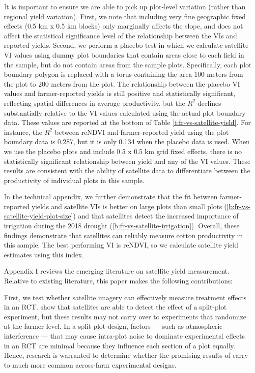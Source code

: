 \documentclass{article}
\begin{document}
It is important to ensure we are able to pick up plot-level variation (rather than regional yield variation). First, we note that including very fine geographic fixed effects (0.5 km x 0.5 km blocks) only marginally affects the slope, and does not affect the statistical significance level of the relationship between the VIs and reported yields. Second, we perform a placebo test in which we calculate satellite VI values using dummy plot boundaries that contain areas close to each field in the sample, but do not contain areas from the sample plots. Specifically, each plot boundary polygon is replaced with a torus containing the area 100 meters from the plot to 200 meters from the plot. The relationship between the placebo VI values and farmer-reported yields is still positive and statistically significant, reflecting spatial differences in average productivity, but the $R^2$ declines substantially relative to the VI values calculated using the actual plot boundary data. These values are reported at the bottom of Table \ref{t:fr-vs-satellite-yield}. For instance, the $R^2$ between reNDVI and farmer-reported yield using the plot boundary data is 0.287, but it is only 0.134 when the placebo data is used. When we use the placebo plots and include 0.5 x 0.5 km grid fixed effects, there is no statistically significant relationship between yield and any of the VI values. These results are consistent with the ability of satellite data to differentiate between the productivity of individual plots in this sample.

In the technical appendix, we further demonstrate that the fit between farmer-reported yields and satellite VIs is better on large plots than small plots (\ref{b:fr-vs-satellite-yield-plot-size}) and that satellites detect the increased importance of irrigation during the 2018 drought (\ref{b:fr-vs-satellite-irrigation}). Overall, these findings demonstrate that satellites can reliably measure cotton productivity in this sample. The best performing VI is reNDVI, so we calculate satellite yield estimates using this index. 

Appendix I reviews the emerging literature on satellite yield measurement. Relative to existing literature, this paper makes the following contributions: 

First, we test whether satellite imagery can effectively measure treatment effects in an RCT. \citet{Jain2019TheData} show that satellites are able to detect the effect of a split-plot experiment, but these results may not carry over to experiments that randomize at the farmer level. In a split-plot design, factors — such as atmospheric interference — that may cause intra-plot noise to dominate experimental effects in an RCT are minimal because they influence each section of a plot equally. Hence, research is warranted to determine whether the promising results of \citet{Jain2019TheData} carry to much more common across-farm experimental designs. 
\end{document}
